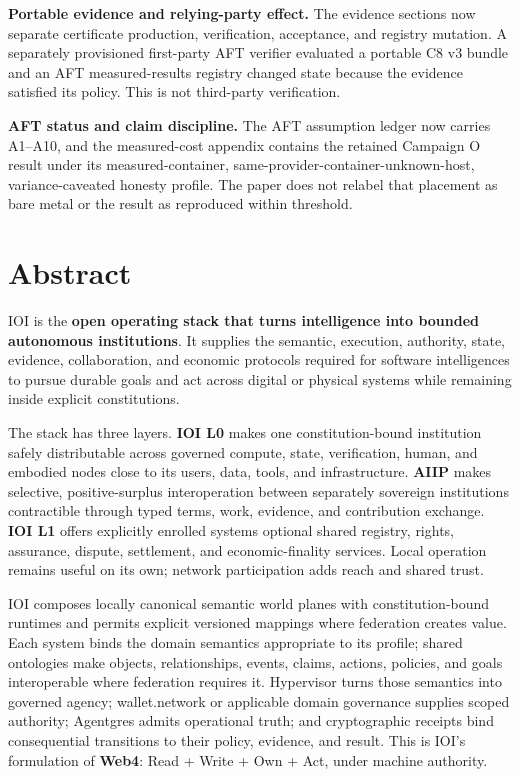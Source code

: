 \documentclass[
  11pt,
]{article}
\begin{document}
\textbf{Portable evidence and relying-party effect.} The evidence sections now
separate certificate production, verification, acceptance, and registry
mutation. A separately provisioned first-party AFT verifier evaluated a
portable C8 v3 bundle and an AFT measured-results registry changed state because
the evidence satisfied its policy. This is not third-party verification.

\textbf{AFT status and claim discipline.} The AFT assumption ledger now carries
A1--A10, and the measured-cost appendix contains the retained Campaign O result
under its measured-container, same-provider-container-unknown-host,
variance-caveated honesty profile. The paper does not relabel that placement as
bare metal or the result as reproduced within threshold.

\hypertarget{abstract}{%
\section{Abstract}\label{abstract}}

IOI is the \textbf{open operating stack that turns intelligence into
bounded autonomous institutions}. It supplies the semantic, execution,
authority, state, evidence, collaboration, and economic protocols required
for software intelligences to pursue durable goals and act across digital or
physical systems while remaining inside explicit constitutions.

The stack has three layers. \textbf{IOI L0} makes one constitution-bound
institution safely distributable across governed compute, state, verification,
human, and embodied nodes close to its users, data, tools, and infrastructure.
\textbf{AIIP} makes selective, positive-surplus interoperation between
separately sovereign institutions contractible through typed terms, work,
evidence, and contribution exchange.
\textbf{IOI L1} offers explicitly
enrolled systems optional shared registry, rights, assurance, dispute,
settlement, and economic-finality services. Local operation remains useful
on its own; network participation adds reach and shared trust.

IOI composes locally canonical semantic world planes with constitution-bound
runtimes and permits explicit versioned mappings where federation creates
value. Each system binds the domain semantics appropriate to its profile;
shared ontologies make objects, relationships, events, claims, actions,
policies, and goals interoperable where federation requires it. Hypervisor
turns those semantics into governed agency; wallet.network or applicable
domain governance supplies scoped authority; Agentgres admits operational
truth; and cryptographic receipts bind consequential transitions to their
policy, evidence, and result. This is IOI's formulation of \textbf{Web4}:
Read + Write + Own + Act, under machine authority.
\end{document}
